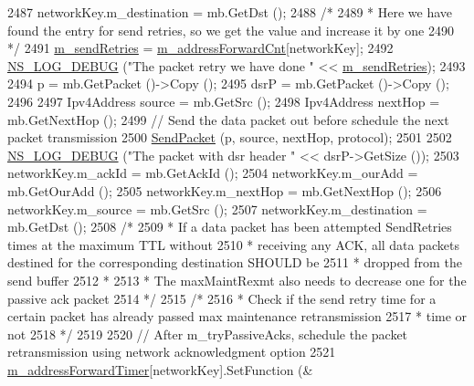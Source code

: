 \begin{DoxyCode}
2487       networkKey.m\_destination = mb.GetDst ();
2488       \textcolor{comment}{/*}
2489 \textcolor{comment}{       * Here we have found the entry for send retries, so we get the value and increase it by one}
2490 \textcolor{comment}{       */}
2491       \hyperlink{classns3_1_1dsr_1_1DsrRouting_a02a55fe3b490af4dbd62953065d293a3}{m\_sendRetries} = \hyperlink{classns3_1_1dsr_1_1DsrRouting_a5042f7e5df0470025fdb6023fcc24411}{m\_addressForwardCnt}[networkKey];
2492       \hyperlink{group__logging_ga413f1886406d49f59a6a0a89b77b4d0a}{NS\_LOG\_DEBUG} (\textcolor{stringliteral}{"The packet retry we have done "} << 
      \hyperlink{classns3_1_1dsr_1_1DsrRouting_a02a55fe3b490af4dbd62953065d293a3}{m\_sendRetries});
2493 
2494       p = mb.GetPacket ()->Copy ();
2495       dsrP = mb.GetPacket ()->Copy ();
2496 
2497       Ipv4Address source = mb.GetSrc ();
2498       Ipv4Address nextHop = mb.GetNextHop ();
2499       \textcolor{comment}{// Send the data packet out before schedule the next packet transmission}
2500       \hyperlink{classns3_1_1dsr_1_1DsrRouting_a84a2caf24a41eef8993b64cb22874f95}{SendPacket} (p, source, nextHop, protocol);
2501 
2502       \hyperlink{group__logging_ga413f1886406d49f59a6a0a89b77b4d0a}{NS\_LOG\_DEBUG} (\textcolor{stringliteral}{"The packet with dsr header "} << dsrP->GetSize ());
2503       networkKey.m\_ackId = mb.GetAckId ();
2504       networkKey.m\_ourAdd = mb.GetOurAdd ();
2505       networkKey.m\_nextHop = mb.GetNextHop ();
2506       networkKey.m\_source = mb.GetSrc ();
2507       networkKey.m\_destination = mb.GetDst ();
2508       \textcolor{comment}{/*}
2509 \textcolor{comment}{       *  If a data packet has been attempted SendRetries times at the maximum TTL without}
2510 \textcolor{comment}{       *  receiving any ACK, all data packets destined for the corresponding destination SHOULD be}
2511 \textcolor{comment}{       *  dropped from the send buffer}
2512 \textcolor{comment}{       *}
2513 \textcolor{comment}{       *  The maxMaintRexmt also needs to decrease one for the passive ack packet}
2514 \textcolor{comment}{       */}
2515       \textcolor{comment}{/*}
2516 \textcolor{comment}{       * Check if the send retry time for a certain packet has already passed max maintenance
       retransmission}
2517 \textcolor{comment}{       * time or not}
2518 \textcolor{comment}{       */}
2519 
2520       \textcolor{comment}{// After m\_tryPassiveAcks, schedule the packet retransmission using network acknowledgment option}
2521       \hyperlink{classns3_1_1dsr_1_1DsrRouting_a4a35b13cdca413ab5bc0b1b3b7b78907}{m\_addressForwardTimer}[networkKey].SetFunction (&

\end{DoxyCode}
